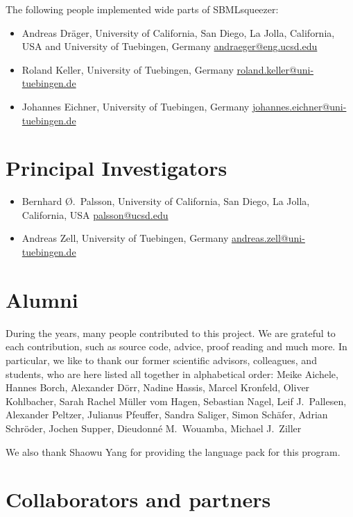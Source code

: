 The following people implemented wide parts of SBMLsqueezer:
\begin{itemize}
\item Andreas Dr\"ager, 
  University of California, San Diego, La Jolla, California, USA and
  University of Tuebingen, Germany
  \href{mailto:andraeger@eng.ucsd.edu}{andraeger@eng.ucsd.edu}
\item Roland Keller,
  University of Tuebingen, Germany
  \href{mailto:roland.keller@uni-tuebingen.de}{roland.keller@uni-tuebingen.de}
\item Johannes Eichner,
  University of Tuebingen, Germany
  \href{mailto:johannes.eichner@uni-tuebingen.de}{johannes.eichner@uni-tuebingen.de}
\end{itemize}

\section{Principal Investigators}

\begin{itemize}
\item Bernhard \O.~Palsson,
  University of California, San Diego, La Jolla, California, USA
  \href{mailto:palsson@ucsd.edu}{palsson@ucsd.edu}
\item Andreas Zell, 
  University of Tuebingen, Germany
  \href{mailto:andreas.zell@uni-tuebingen.de}{andreas.zell@uni-tuebingen.de}
\end{itemize}

\section{Alumni}

During the years, many people contributed to this project.
We are grateful to each contribution, such as source code, advice, proof reading
and much more. In particular, we like to thank our former scientific advisors,
colleagues, and students, who are here listed all together in alphabetical
order:
Meike Aichele,
Hannes Borch,
Alexander D\"orr,
Nadine Hassis,
Marcel Kronfeld,
Oliver Kohlbacher,
Sarah Rachel M\"uller vom Hagen,
Sebastian Nagel,
Leif J.~Pallesen,
Alexander Peltzer,
Julianus Pfeuffer,
Sandra Saliger,
Simon Sch\"afer,
Adrian Schr\"oder,
Jochen Supper,
Dieudonn\'e M.~Wouamba,
Michael J.~Ziller

We also thank Shaowu Yang for providing the \Chinese language pack for this program.


\section{Collaborators and partners}

